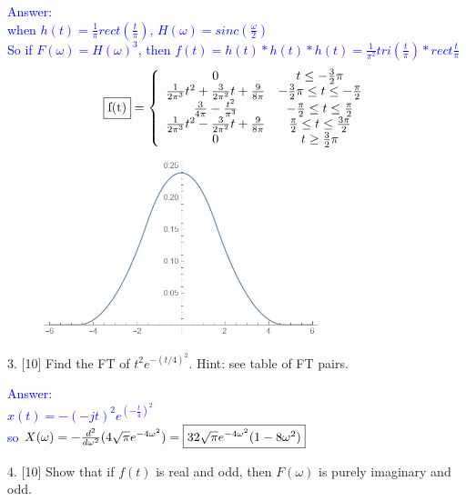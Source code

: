 \documentclass[12pt,a4paper]{article}
\begin{document}
\begin{tcolorbox}
\normalsize
\textcolor{blue}{Answer:\\
when $h(t)=\frac{1}{\pi}rect(\frac{t}{\pi})$, $H(\omega)=sinc(\frac{\omega}{2})$\\
So if $F(\omega)=H(\omega)^3$, then $f(t)=h(t)*h(t)*h(t)=\frac{1}{\pi^2}tri(\frac{t}{\pi})*rect\frac{t}{\pi}$\\
$$
\fbox{f(t)}=\left\{\begin{array}{ccc}
0 & t \leq-\frac{3}{2} \pi \\
\frac{1}{2 \pi^{3}} t^{2}+\frac{3}{2 \pi^{2}} t+\frac{9}{8 \pi}  & -\frac{3}{2} \pi \leq t \leq-\frac{\pi}{2}\\
\frac{3}{4 \pi}-\frac{t^{2}}{\pi^{3}} & -\frac{\pi}{2} \leq t \leq \frac{\pi}{2} \\
\frac{1}{2 \pi^{3}} t^{2}-\frac{3}{2 \pi^{2}} t+\frac{9}{8 \pi} & \frac{\pi}{2} \leq t \leq \frac{3 \pi}{2} \\
0 & t \geq \frac{3}{2} \pi
\end{array}\right.
$$
\begin{figure}[H]
    \centering
    \includegraphics[width=8cm]{2.jpg}
\end{figure}
}
\end{tcolorbox}

\begin{tcolorbox}[colback = white]
3. [10] Find the FT of $t^{2} e^{-(t / 4)^{2}}$. Hint: see table of FT pairs.
\end{tcolorbox}

\begin{tcolorbox}
\normalsize
\textcolor{blue}{Answer:\\
$x(t)=-(-jt)^2e^(-\frac{t}{4})^2$\\
so $X(\omega)=-\frac{d^2}{d\omega^2}(4\sqrt{\pi}e^{-4\omega^2})=\fbox{$32\sqrt{\pi}e^{-4\omega^2}(1-8\omega^2)$}$
}
\end{tcolorbox}

\begin{tcolorbox}[colback = white]
4. [10] Show that if $f(t)$ is real and odd, then $F(\omega)$ is purely imaginary and odd.
\end{tcolorbox}
\end{document}
